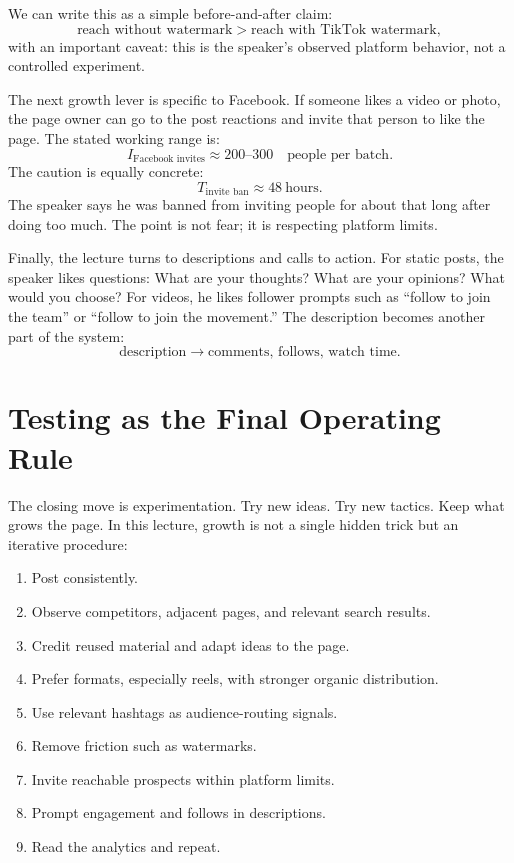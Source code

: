 We can write this as a simple before-and-after claim:
\begin{equation}
\text{reach without watermark}
>
\text{reach with TikTok watermark},
\end{equation}
with an important caveat: this is the speaker's observed platform behavior, not a controlled experiment.

The next growth lever is specific to Facebook. If someone likes a video or photo, the page owner can go to the post reactions and invite that person to like the page. The stated working range is:
\begin{equation}
I_{\text{Facebook invites}} \approx 200\text{--}300
\quad \text{people per batch}.
\end{equation}
The caution is equally concrete:
\begin{equation}
T_{\text{invite ban}} \approx 48\ \text{hours}.
\end{equation}
The speaker says he was banned from inviting people for about that long after doing too much. The point is not fear; it is respecting platform limits.

Finally, the lecture turns to descriptions and calls to action. For static posts, the speaker likes questions: What are your thoughts? What are your opinions? What would you choose? For videos, he likes follower prompts such as ``follow to join the team'' or ``follow to join the movement.'' The description becomes another part of the system:
\begin{equation}
\text{description}
\longrightarrow
\text{comments, follows, watch time}.
\end{equation}

\section{Testing as the Final Operating Rule}

The closing move is experimentation. Try new ideas. Try new tactics. Keep what grows the page. In this lecture, growth is not a single hidden trick but an iterative procedure:
\begin{enumerate}
\item Post consistently.
\item Observe competitors, adjacent pages, and relevant search results.
\item Credit reused material and adapt ideas to the page.
\item Prefer formats, especially reels, with stronger organic distribution.
\item Use relevant hashtags as audience-routing signals.
\item Remove friction such as watermarks.
\item Invite reachable prospects within platform limits.
\item Prompt engagement and follows in descriptions.
\item Read the analytics and repeat.
\end{enumerate}

